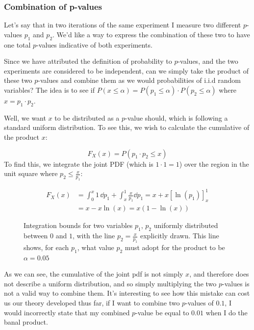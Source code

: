 \subsubsection{Combination of p-values}

Let's say that in two iterations of the same experiment I measure two different $p$-values $p_1$ and $p_2$. We'd like a way to express the combination of these two to have one total $p$-values indicative of both experiments. 

Since we have attributed the definition of probability to $p$-values, and the two experiments are considered to be independent, can we simply take the product of these two $p$-values and combine them as we would probabilities of i.i.d random variables? The idea is to see if $P\left(x\leq\alpha\right) = P\left(p_1\leq\alpha\right)\cdot P\left(p_2\leq\alpha\right)$ where $x=p_1\cdot p_2$.

Well, we want $x$ to be distributed as a $p$-value should, which is following a standard uniform distribution. To see this, we wish to calculate the cumulative of the product $x$:

	\[
	F_X(x) =  P(p_1 \cdot p_2 \leq x)
	\]
To find this, we integrate the joint PDF (which is $1 \cdot 1 = 1$) over the region in the unit square where $p_2 \leq \frac{x}{p_1}$:


\begin{align*}
	F_X(x) &= \int_{0}^{x} 1 \, \dd p_1 + \int_{x}^{1} \frac{x}{p_1} \dd p_1 = x + x \left[ \ln\left(p_1\right) \right]_{x}^{1}\\
	&= x - x\ln(x) = x(1 - \ln(x))
\end{align*}


\begin{figure}[H]
	\centering
	
	\caption{Integration bounds for two variables $p_1$, $p_2$ uniformly distributed between $0$ and $1$, with the line $p_2=\frac{x}{p_1}$ explicitly drawn. This line shows, for each $p_1$, what value $p_2$ must adopt for the product to be $\alpha=0.05$}
	\label{images/p_value_comb}
\end{figure}

As we can see, the cumulative of the joint pdf is not simply $x$, and therefore does not describe a uniform distribution, and so simply multiplying the two $p$-values is not a valid way to combine them. It's interesting to see how this mistake can cost us our theory developed thus far, if I want to combine two $p$-values of $0.1$, I would incorrectly state that my combined $p$-value be equal to $0.01$ when I do the banal product. 

